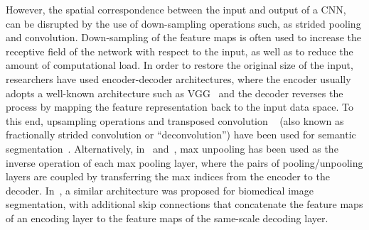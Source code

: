 \documentclass[journal]{IEEEtran}
\begin{document}
However, the spatial correspondence between the input and output of a CNN, can be disrupted by the use of down-sampling operations such, as strided pooling and convolution. Down-sampling of the feature maps is often used to increase the receptive field of the network with respect to the input, as well as to reduce the amount of computational load. In order to restore the original size of the input, researchers have used encoder-decoder architectures, where the encoder usually adopts a well-known architecture such as VGG~\cite{simonyan2014very} and the decoder reverses the process by mapping the feature representation back to the input data space. To this end, upsampling operations and transposed convolution ~\cite{zeiler2014visualizing} (also known as fractionally strided convolution or ``deconvolution'') have been used for semantic segmentation~\cite{long2015fully}. Alternatively, in~\cite{badrinarayanan2015segnet} and~\cite{noh2015learning}, max unpooling has been used as the inverse operation of each max pooling layer, where the pairs of pooling/unpooling layers are coupled by transferring the max indices from the encoder to the decoder. In~\cite{Unet}, a similar architecture was proposed for biomedical image segmentation, with additional skip connections that concatenate the feature maps of an encoding layer to the feature maps of the same-scale decoding layer.
\end{document}
